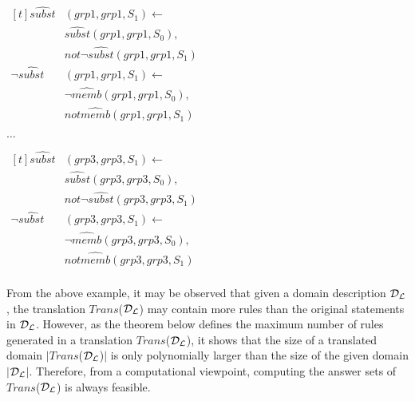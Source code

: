 \documentclass[global,twocolumn,draft]{svjour}
\newenvironment{vexample}
  {\begin{example}\hspace{0.25em}}
  {\end{example}}
\begin{document}
\begin{vexample}
\begin{enumerate}
              \begin{math}
                \begin{aligned}[t]
                  \hat{subst}&(grp1, grp1, S_{1}) \leftarrow \\
                  & \hat{subst}(grp1, grp1, S_{0}), \\
                  & not \lnot \hat{subst}(grp1, grp1, S_{1}) \\
                  \lnot \hat{subst}&(grp1, grp1, S_{1}) \leftarrow \\
                  & \lnot \hat{memb}(grp1, grp1, S_{0}), \\
                  & not \hat{memb}(grp1, grp1, S_{1})
                \end{aligned}
              \end{math}

              $\ldots$

              \begin{math}
                \begin{aligned}[t]
                  \hat{subst}&(grp3, grp3, S_{1}) \leftarrow \\
                  & \hat{subst}(grp3, grp3, S_{0}), \\
                  & not \lnot \hat{subst}(grp3, grp3, S_{1}) \\
                  \lnot \hat{subst}&(grp3, grp3, S_{1}) \leftarrow \\
                  & \lnot \hat{memb}(grp3, grp3, S_{0}), \\
                  & not \hat{memb}(grp3, grp3, S_{1}) \\
                \end{aligned}
              \end{math}
          \end{enumerate}
        \end{vexample}

        From the above example, it may be observed that given a domain
        description ${\cal D_{L}}$, the translation $Trans$(${\cal D_{L}}$) may
        contain more rules than the original statements in ${\cal D_{L}}$.
        However, as the theorem below defines the maximum number of rules
        generated in a translation $Trans$(${\cal D_{L}}$), it shows that
        the size of a translated domain $|$$Trans$(${\cal D_{L}}$)$|$ is only
        polynomially larger than the size of the given domain
        $|$${\cal D_{L}}$$|$. Therefore, from a computational viewpoint,
        computing the answer sets of $Trans$(${\cal D_{L}}$) is always
        feasible.
\end{document}
